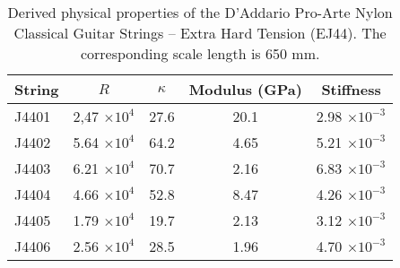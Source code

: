 \begin{table}%
  \centering
  \caption{\label{tbl:ej44_props} Derived physical properties of the D'Addario Pro-Arte Nylon Classical Guitar Strings -- Extra Hard Tension (EJ44). The corresponding scale length is 650 mm.}
    \begin{tabular}{lcccc}
    \hline \hline
    String  & $R$ & $\kappa$ & Modulus (GPa) & Stiffness \\
    \hline
    J4401 & 2,47 $\times 10^{4}$ & 27.6 & 20.1 & 2.98 $\times 10^{-3}$ \\
    J4402 & 5.64 $\times 10^{4}$ & 64.2 & 4.65 & 5.21 $\times 10^{-3}$ \\
    J4403 & 6.21 $\times 10^{4}$ & 70.7 & 2.16 & 6.83 $\times 10^{-3}$ \\
    J4404 & 4.66 $\times 10^{4}$ & 52.8 & 8.47 & 4.26 $\times 10^{-3}$ \\
    J4405 & 1.79 $\times 10^{4}$ & 19.7 & 2.13 & 3.12 $\times 10^{-3}$ \\
    J4406 & 2.56 $\times 10^{4}$ & 28.5 & 1.96 & 4.70 $\times 10^{-3}$ \\
    \hline
    \end{tabular}%
  \label{tab:addlabel}%
\end{table}%


